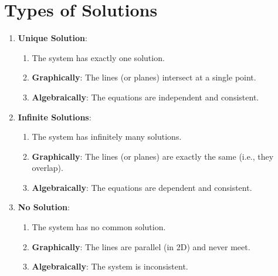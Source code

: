 







\section{Types of Solutions}

\begin{enumerate}

\item \textbf{Unique Solution}:
\begin{enumerate}
    \item The system has exactly one solution.
    \hfill \cite{common/online/chatgpt}

    \item \textbf{Graphically}: The lines (or planes) intersect at a single point.
    \hfill \cite{common/online/chatgpt}

    \item \textbf{Algebraically}: The equations are independent and consistent.
    \hfill \cite{common/online/chatgpt}
\end{enumerate}

\item \textbf{Infinite Solutions}:
\begin{enumerate}
    \item The system has infinitely many solutions.
    \hfill \cite{common/online/chatgpt}

    \item \textbf{Graphically}: The lines (or planes) are exactly the same (i.e., they overlap).
    \hfill \cite{common/online/chatgpt}

    \item \textbf{Algebraically}: The equations are dependent and consistent.
    \hfill \cite{common/online/chatgpt}
\end{enumerate}

\item \textbf{No Solution}:
\begin{enumerate}
    \item The system has no common solution.
    \hfill \cite{common/online/chatgpt}

    \item \textbf{Graphically}: The lines are parallel (in 2D) and never meet.
    \hfill \cite{common/online/chatgpt}

    \item \textbf{Algebraically}: The system is inconsistent.
    \hfill \cite{common/online/chatgpt}
\end{enumerate}

\end{enumerate}


